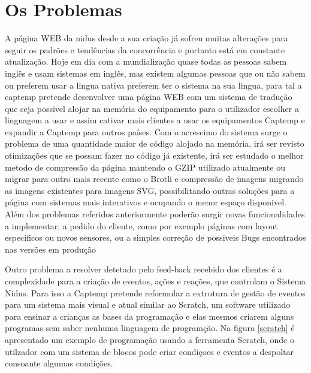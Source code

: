 \section{Os Problemas}
A página WEB da nidus desde a sua criação já sofreu muitas alterações para seguir os padrões e tendências da concorrência e portanto está em constante atualização. Hoje em dia com a mundialização quase todas as pessoas sabem inglês e usam sistemas em inglês, mas existem algumas pessoas que ou não sabem ou preferem usar a lingua nativa preferem ter o sistema na sua lingua, para tal a captemp pretende desenvolver uma página WEB com um sistema de tradução que seja possivel alojar na memória do equipamento para o utilizador escolher a linguagem a usar e assim cativar mais clientes a usar os equipamentos Captemp e expandir a Captemp para outros países. Com o acrescimo do sistema surge o problema de uma quantidade maior de código alojado na memória, irá ser revisto otimizações que se possam fazer no código já existente, irá ser estudado o melhor metodo de compressão da página mantendo o GZIP utilizado atualmente ou migrar para outro mais recente como o Brotli e compressão de imagens migrando as imagens existentes para imagens SVG, possibilitando outras soluções para a página com sistemas mais interativos e ocupando o menor espaço disponivel. Além dos problemas referidos anteriormente poderão surgir novas funcionalidades a implementar, a pedido do cliente, como por exemplo páginas com layout especificos ou novos sensores, ou a simples correção de possiveis Bugs encontrados nas versões em produção
\par
Outro problema a resolver detetado pelo feed-back recebido dos clientes é a complexidade para a criação de eventos, ações e reações, que controlam o Sistema Nidus. Para isso a Captemp pretende reformular a extrutura de gestão de eventos para um sistema mais visual  e atual similar ao Scratch, um software utilizado para ensinar a crianças as bases da programação e elas mesmos criarem alguns programas sem saber nenhuma linguagem de programção. Na figura \ref{scratch} é apresentado um exemplo de programação usando a ferramenta Scratch, onde o utilzador com um sistema de blocos pode criar condiçoes e eventos a despoltar consoante algumas condições.
